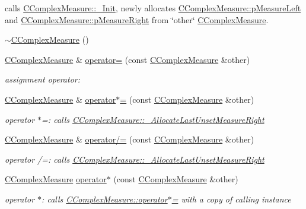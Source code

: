 \begin{DoxyCompactItemize}
\begin{DoxyCompactList}
 calls \hyperlink{classCComplexMeasure_aed6efc43efe99d8cf1072ac98ec8d21c}{C\+Complex\+Measure\+::\+\_\+\+Init}, newly allocates \hyperlink{classCComplexMeasure_a4d68f86891a036df81f5b1a344c36f27}{C\+Complex\+Measure\+::p\+Measure\+Left} and \hyperlink{classCComplexMeasure_abbafc4b16676d223ed34860b8ece1b6b}{C\+Complex\+Measure\+::p\+Measure\+Right} from \char`\"{}other\char`\"{} \hyperlink{classCComplexMeasure}{C\+Complex\+Measure}. \end{DoxyCompactList}\item 
\hyperlink{classCComplexMeasure_a4b6895d4eef03df92d8ea1d8ad4f2f3d}{$\sim$\+C\+Complex\+Measure} ()
\item 
\hyperlink{classCComplexMeasure}{C\+Complex\+Measure} \& \hyperlink{classCComplexMeasure_a37668c1f7c157050080c0065ecbb596d}{operator=} (const \hyperlink{classCComplexMeasure}{C\+Complex\+Measure} \&other)
\begin{DoxyCompactList}\small\item\em assignment operator\+: \end{DoxyCompactList}\item 
\hyperlink{classCComplexMeasure}{C\+Complex\+Measure} \& \hyperlink{classCComplexMeasure_a66de753c892ed0a82fa8f2eb4d98029d}{operator$\ast$=} (const \hyperlink{classCComplexMeasure}{C\+Complex\+Measure} \&other)
\begin{DoxyCompactList}\small\item\em operator $\ast$=\+: calls \hyperlink{classCComplexMeasure_aee812c93b8b2fe3839e9a38df63cfd53}{C\+Complex\+Measure\+::\+\_\+\+Allocate\+Last\+Unset\+Measure\+Right} \end{DoxyCompactList}\item 
\hyperlink{classCComplexMeasure}{C\+Complex\+Measure} \& \hyperlink{classCComplexMeasure_a68c42a3ea08d1482f4dfdda5e34407f5}{operator/=} (const \hyperlink{classCComplexMeasure}{C\+Complex\+Measure} \&other)
\begin{DoxyCompactList}\small\item\em operator /=\+: calls \hyperlink{classCComplexMeasure_aee812c93b8b2fe3839e9a38df63cfd53}{C\+Complex\+Measure\+::\+\_\+\+Allocate\+Last\+Unset\+Measure\+Right} \end{DoxyCompactList}\item 
\hyperlink{classCComplexMeasure}{C\+Complex\+Measure} \hyperlink{classCComplexMeasure_afb04c59abf1f8ed44fe13d56df5d322c}{operator$\ast$} (const \hyperlink{classCComplexMeasure}{C\+Complex\+Measure} \&other)
\begin{DoxyCompactList}\small\item\em operator $\ast$\+: calls \hyperlink{classCComplexMeasure_a66de753c892ed0a82fa8f2eb4d98029d}{C\+Complex\+Measure\+::operator$\ast$=} with a copy of calling instance \end{DoxyCompactList}\item 

\end{DoxyCompactItemize}
